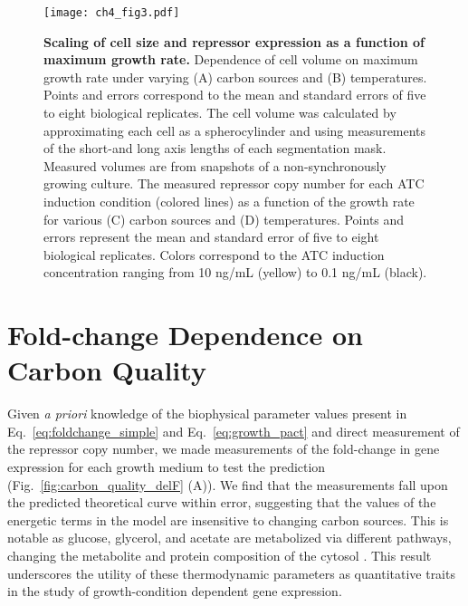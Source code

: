 \documentclass[12pt]{caltech_thesis}
\begin{document}
\hypertarget{fig:scaling}{%
\begin{figure}
\centering
\texttt{[image: ch4\_fig3.pdf]}
\caption[{Scaling of cel size and repressor expression as a function of
maximum growth rate}]{\textbf{Scaling of cell size and repressor
expression as a function of maximum growth rate.} Dependence of cell
volume on maximum growth rate under varying (A) carbon sources and (B)
temperatures. Points and errors correspond to the mean and standard
errors of five to eight biological replicates. The cell volume was
calculated by approximating each cell as a spherocylinder and using
measurements of the short-and long axis lengths of each segmentation
mask. Measured volumes are from snapshots of a non-synchronously growing
culture. The measured repressor copy number for each ATC induction
condition (colored lines) as a function of the growth rate for various
(C) carbon sources and (D) temperatures. Points and errors represent the
mean and standard error of five to eight biological replicates. Colors
correspond to the ATC induction concentration ranging from 10 ng/mL
(yellow) to 0.1 ng/mL (black).}
\label{fig:scaling}
\end{figure}
}

\hypertarget{fold-change-dependence-on-carbon-quality}{%
\section{Fold-change Dependence on Carbon
Quality}\label{fold-change-dependence-on-carbon-quality}}

Given \emph{a priori} knowledge of the biophysical parameter values
\autocite{garcia2011,razo-mejia2018} present in
Eq.~\ref{eq:foldchange_simple} and Eq.~\ref{eq:growth_pact} and direct
measurement of the repressor copy number, we made measurements of the
fold-change in gene expression for each growth medium to test the
prediction (Fig.~\ref{fig:carbon_quality_delF} (A)). We find that the
measurements fall upon the predicted theoretical curve within error,
suggesting that the values of the energetic terms in the model are
insensitive to changing carbon sources. This is notable as glucose,
glycerol, and acetate are metabolized via different pathways, changing
the metabolite and protein composition of the cytosol
\autocite{martinez-gomez2012,kim2007}. This result underscores the
utility of these thermodynamic parameters as quantitative traits in the
study of growth-condition dependent gene expression.
\end{document}
